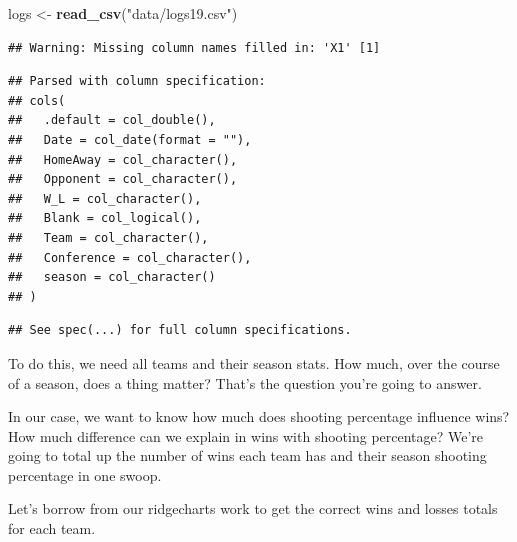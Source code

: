 \documentclass[
]{book}
\newenvironment{Shaded}{\begin{snugshade}}{\end{snugshade}}
\newcommand{\DataTypeTok}[1]{\textcolor[rgb]{0.13,0.29,0.53}{#1}}
\newcommand{\DecValTok}[1]{\textcolor[rgb]{0.00,0.00,0.81}{#1}}
\newcommand{\KeywordTok}[1]{\textcolor[rgb]{0.13,0.29,0.53}{\textbf{#1}}}
\newcommand{\NormalTok}[1]{#1}
\newcommand{\OperatorTok}[1]{\textcolor[rgb]{0.81,0.36,0.00}{\textbf{#1}}}
\newcommand{\StringTok}[1]{\textcolor[rgb]{0.31,0.60,0.02}{#1}}
\begin{document}
\begin{Shaded}
\begin{Highlighting}[]
\NormalTok{logs <-}\StringTok{ }\KeywordTok{read_csv}\NormalTok{(}\StringTok{"data/logs19.csv"}\NormalTok{)}
\end{Highlighting}
\end{Shaded}

\begin{verbatim}
## Warning: Missing column names filled in: 'X1' [1]
\end{verbatim}

\begin{verbatim}
## Parsed with column specification:
## cols(
##   .default = col_double(),
##   Date = col_date(format = ""),
##   HomeAway = col_character(),
##   Opponent = col_character(),
##   W_L = col_character(),
##   Blank = col_logical(),
##   Team = col_character(),
##   Conference = col_character(),
##   season = col_character()
## )
\end{verbatim}

\begin{verbatim}
## See spec(...) for full column specifications.
\end{verbatim}

To do this, we need all teams and their season stats. How much, over the course of a season, does a thing matter? That's the question you're going to answer.

In our case, we want to know how much does shooting percentage influence wins? How much difference can we explain in wins with shooting percentage? We're going to total up the number of wins each team has and their season shooting percentage in one swoop.

Let's borrow from our ridgecharts work to get the correct wins and losses totals for each team.

\begin{Shaded}
\end{Shaded}
\end{document}
